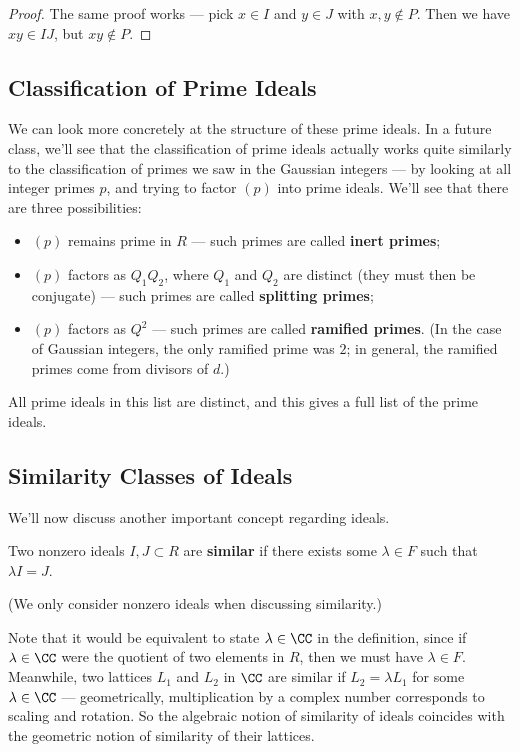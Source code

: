 \begin{proof}
    The same proof works --- pick $x \in I$ and $y \in J$ with $x, y \not\in P$. Then we have $xy \in IJ$, but $xy \not\in P$.
\end{proof}

\subsection{Classification of Prime Ideals}

We can look more concretely at the structure of these prime ideals. In a future class, we'll see that the classification of prime ideals actually works quite similarly to the classification of primes we saw in the Gaussian integers --- by looking at all integer primes $p$, and trying to factor $(p)$ into prime ideals. We'll see that there are three possibilities:
\begin{itemize}
    \item $(p)$ remains prime in $R$ --- such primes are called \textbf{inert primes};
    \item $(p)$ factors as $Q_1Q_2$, where $Q_1$ and $Q_2$ are distinct (they must then be conjugate) --- such primes are called \textbf{splitting primes};
    \item $(p)$ factors as $Q^2$ --- such primes are called \textbf{ramified primes}. (In the case of Gaussian integers, the only ramified prime was $2$; in general, the ramified primes come from divisors of $d$.)
\end{itemize}
All prime ideals in this list are distinct, and this gives a full list of the prime ideals. 

\subsection{Similarity Classes of Ideals}

We'll now discuss another important concept regarding ideals. 

\begin{definition}
    Two nonzero ideals $I, J \subset R$ are \textbf{similar} if there exists some $\lambda \in F$ such that $\lambda I = J$. 
\end{definition}

(We only consider nonzero ideals when discussing similarity.)

Note that it would be equivalent to state $\lambda \in \CC$ in the definition, since if $\lambda \in \CC$ were the quotient of two elements in $R$, then we must have $\lambda \in F$. Meanwhile, two lattices $L_1$ and $L_2$ in $\CC$ are similar if $L_2 = \lambda L_1$ for some $\lambda \in \CC$ --- geometrically, multiplication by a complex number corresponds to scaling and rotation. So the algebraic notion of similarity of ideals coincides with the geometric notion of similarity of their lattices. 

